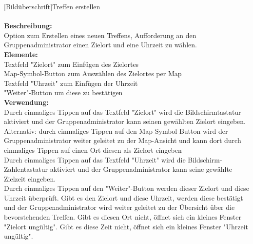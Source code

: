 [Bildüberschrift]Treffen erstellen \\ \\
\textbf{Beschreibung:}\\
Option zum Erstellen eines neuen Treffens, Aufforderung an den Gruppenadministrator einen Zielort und eine Uhrzeit zu wählen.\\
\textbf{Elemente:}\\
Textfeld "Zielort" zum Einfügen des Zielortes\\
Map-Symbol-Button zum Auswählen des Zielortes per Map\\
Textfeld "Uhrzeit" zum Einfügen der Uhrzeit\\
"Weiter"-Button um diese zu bestätigen\\
\textbf{Verwendung:}\\
Durch einmaliges Tippen auf das Textfeld "Zielort" wird die Bildschirmtastatur aktiviert und der Gruppenadministrator kann seinen gewählten Zielort eingeben.\\
Alternativ: durch einmaliges Tippen auf den Map-Symbol-Button wird der Gruppenadministrator weiter geleitet zu der Map-Ansicht und kann dort durch einmaliges Tippen auf einen Ort diesen als Zielort eingeben\\
Durch einmaliges Tippen auf das Textfeld "Uhrzeit" wird die Bildschirm-Zahlentastatur aktiviert und der Gruppenadministrator kann seine gewählte Zielzeit eingeben.\\
Durch einmaliges Tippen auf den "Weiter"-Button werden dieser Zielort und diese Uhrzeit überprüft. Gibt es den Zielort und diese Uhrzeit, werden diese bestätigt und der Gruppenadministrator wird weiter geleitet zu der Übersicht über die bevorstehenden Treffen. Gibt es diesen Ort nicht, öffnet sich ein kleines Fenster "Zielort ungültig". Gibt es diese Zeit nicht, öffnet sich ein kleines Fenster "Uhrzeit ungültig".\\ \\

